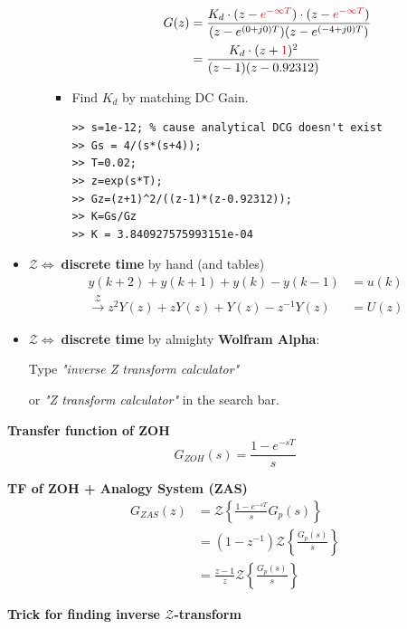 \begin{itemize}
\begin{itemize}
\begin{itemize}
\begin{align*}
                G(z) &= \frac{K_d \cdot  (z-\color{red} e^{-\infty T}\color{black})\cdot(z-\color{red} e^{-\infty T}\color{black}) }{(z-e^{(0+j0)T})(z-e^{(-4+j0)T})} \\
                &= \frac{K_d \cdot (z+\color{red}1 \color{black})^2 }{(z-1)(z-0.92312)} 
            \end{align*}
            \item Find $K_d$ by matching DC Gain.
\begin{lstlisting}
>> s=1e-12; % cause analytical DCG doesn't exist
>> Gs = 4/(s*(s+4));
>> T=0.02;
>> z=exp(s*T);
>> Gz=(z+1)^2/((z-1)*(z-0.92312));
>> K=Gs/Gz
>> K = 3.840927575993151e-04
\end{lstlisting}
        \end{itemize}
    \end{itemize}
    
    \item $\bm{\mathcal{Z}\Longleftrightarrow\;}$\textbf{discrete time} by hand (and tables)
    \begin{align*}
        y(k+2) + y(k+1) + y(k) - y(k-1) &= u(k) \\
        \xrightarrow{\mathcal{Z}} z^2 Y(z) + zY(z) + Y(z) - z^{-1} Y(z) &= U(z)
    \end{align*}
    \item $\bm{\mathcal{Z}\Longleftrightarrow\;}$\textbf{discrete time} by almighty \textbf{Wolfram Alpha}: 
    
    Type \textit{"inverse Z transform calculator"} 
    
    or \textit{"Z transform calculator"} in the search bar.
\end{itemize}






\textbf{\large Transfer function of ZOH}
\begin{equation*}
    G_{ZOH}(s) = \frac{1-e^{-sT}}{s} 
\end{equation*}

\textbf{\large TF of ZOH + Analogy System (ZAS)}
\begin{align*}
    G_{ZAS}(z) &= \mathcal{Z}\left\{\frac{1-e^{-sT}}{s}G_{p}(s)\right\} \\
    &=  (1-z^{-1})\mathcal{Z}\left\{\frac{G_p (s)}{s}\right\} \\
    &= \frac{z-1}{z} \mathcal{Z}\left\{\frac{G_p (s)}{s}\right\}
\end{align*}

\textbf{\large Trick for finding inverse $\mathcal{Z}$-transform}

